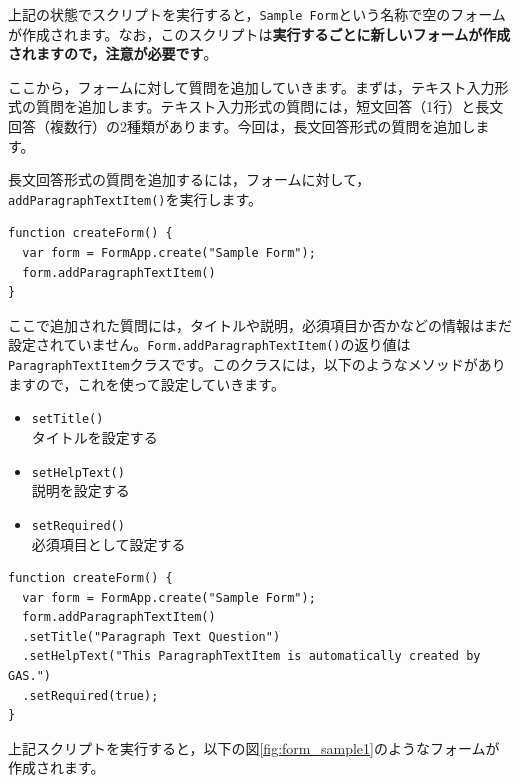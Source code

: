 \documentclass[uplatex,a4j]{jsarticle}
\begin{document}
上記の状態でスクリプトを実行すると，\verb|Sample Form|という名称で空のフォームが作成されます。なお，このスクリプトは\textbf{実行するごとに新しいフォームが作成されますので，注意が必要です}。

ここから，フォームに対して質問を追加していきます。まずは，テキスト入力形式の質問を追加します。テキスト入力形式の質問には，短文回答（1行）と長文回答（複数行）の2種類があります。今回は，長文回答形式の質問を追加します。

長文回答形式の質問を追加するには，フォームに対して，\verb|addParagraphTextItem()|を実行します。

\begin{lstlisting}[basicstyle=\ttfamily\footnotesize,frame=single,caption=FormApp sample 3]
function createForm() {
  var form = FormApp.create("Sample Form");
  form.addParagraphTextItem()
}
\end{lstlisting}

ここで追加された質問には，タイトルや説明，必須項目か否かなどの情報はまだ設定されていません。\verb|Form.addParagraphTextItem()|の返り値は\verb|ParagraphTextItem|クラスです。このクラスには，以下のようなメソッドがありますので，これを使って設定していきます。

\begin{itemize}
\item \verb|setTitle()|\\
タイトルを設定する
\item \verb|setHelpText()|\\
説明を設定する
\item \verb|setRequired()|\\
必須項目として設定する
\end{itemize}

\begin{lstlisting}[basicstyle=\ttfamily\footnotesize,frame=single,caption=FormApp sample 4]
function createForm() {
  var form = FormApp.create("Sample Form");
  form.addParagraphTextItem()
  .setTitle("Paragraph Text Question")
  .setHelpText("This ParagraphTextItem is automatically created by GAS.")
  .setRequired(true);
}
\end{lstlisting}

上記スクリプトを実行すると，以下の図\ref{fig:form_sample1}のようなフォームが作成されます。
\end{document}
